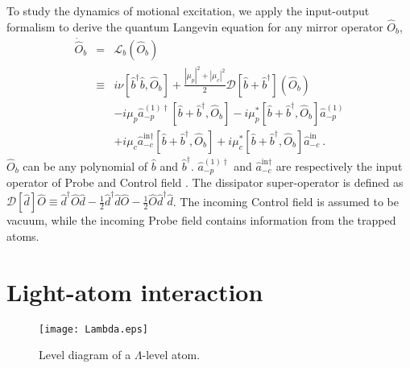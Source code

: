 \documentclass[aps, pra, reprint, amsmath, amssymb, groupedaddress, acknowledgments]{revtex4-1}
\begin{document}
To study the dynamics of motional excitation, we apply the input-output formalism \cite{book:Gardiner_Zoller} to derive the quantum Langevin equation for any mirror operator $\hat{O}_b$,
\begin{eqnarray}
\dot{\hat{O}}_b &=&\mathcal{L}_b (\hat{O}_b) \nonumber \\
&\equiv& i \nu [\hat{b}^\dag \hat{b}, \hat{O}_b] + \frac{|\mu_p|^2+|\mu_c|^2}{2} \mathcal{D}[\hat{b}+\hat{b}^\dag](\hat{O}_b)\nonumber \\
&&- i\mu_p \hat{a}^{(1)\dag}_{-p}[\hat{b}+\hat{b}^\dag,\hat{O}_b]  -i \mu_p^\ast [\hat{b}+\hat{b}^\dag,\hat{O}_b] \hat{a}^{(1)}_{-p} \nonumber \\
&&+ i \mu_c \hat{a}^{\textrm{in}\dag}_{-c}  [\hat{b}+\hat{b}^\dag,\hat{O}_b]  +i \mu_c^\ast [\hat{b}+\hat{b}^\dag,\hat{O}_b] \hat{a}^{\textrm{in}}_{-c}  ~. \label{eq:me_Ob}
\end{eqnarray}
$\hat{O}_b$ can be any polynomial of $\hat{b}$ and $\hat{b}^\dag$.  $\hat{a}^{(1)\dag}_{-p}$ and $\hat{a}^{\textrm{in}\dag}_{-c}$ are respectively the input operator of Probe and Control field \cite{book:Gardiner_Zoller}.  The dissipator super-operator is defined as $\mathcal{D}[\hat{d}]\hat{O}\equiv \hat{d}^\dag \hat{O}\hat{d} -\frac{1}{2}\hat{d}^\dag\hat{d}\hat{O}-\frac{1}{2}\hat{O}\hat{d}^\dag\hat{d}$.  The incoming Control field is assumed to be vacuum, while the incoming Probe field contains information from the trapped atoms.


\section{Light-atom interaction \label{sec:atom}}

\begin{figure}
\begin{center}
\texttt{[image: Lambda.eps]}
\caption{ \label{fig:Lambda} Level diagram of a $\Lambda$-level atom.}
\end{center}
\end{figure}
\end{document}
